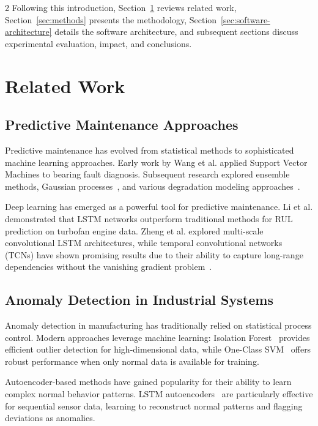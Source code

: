 \documentclass{ijceds} %
\newcommand{\secref}[1]{Section~\ref{#1}}
\begin{document}
\begin{multicols}{2}
Following this introduction, \secref{sec:relatedwork} reviews related work, \secref{sec:methods} presents the methodology, \secref{sec:software-architecture} details the software architecture, and subsequent sections discuss experimental evaluation, impact, and conclusions.

\section{Related Work}
\label{sec:relatedwork}

\subsection{Predictive Maintenance Approaches}

Predictive maintenance has evolved from statistical methods to sophisticated machine learning approaches. Early work by Wang et al.\cite{wang2002support} applied Support Vector Machines to bearing fault diagnosis. Subsequent research explored ensemble methods\cite{zhang2017ensemble}, Gaussian processes~\cite{liu2013gaussian}, and various degradation modeling approaches~\cite{si2011remaining}.

Deep learning has emerged as a powerful tool for predictive maintenance. Li et al.\cite{li2018remaining} demonstrated that LSTM networks outperform traditional methods for RUL prediction on turbofan engine data. Zheng et al.\cite{zheng2017long} explored multi-scale convolutional LSTM architectures, while temporal convolutional networks (TCNs) have shown promising results due to their ability to capture long-range dependencies without the vanishing gradient problem~\cite{bai2018empirical}.

\subsection{Anomaly Detection in Industrial Systems}

Anomaly detection in manufacturing has traditionally relied on statistical process control. Modern approaches leverage machine learning: Isolation Forest~\cite{liu2008isolation} provides efficient outlier detection for high-dimensional data, while One-Class SVM~\cite{scholkopf2001estimating} offers robust performance when only normal data is available for training.

Autoencoder-based methods have gained popularity for their ability to learn complex normal behavior patterns. LSTM autoencoders~\cite{malhotra2016lstm} are particularly effective for sequential sensor data, learning to reconstruct normal patterns and flagging deviations as anomalies.


\end{multicols}
\end{document}
